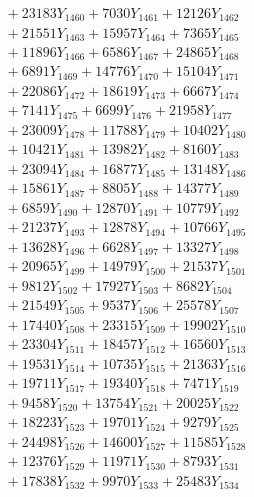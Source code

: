 \documentclass[a4paper,10pt]{article}
\begin{document}
{\begin{align}
&\;  + 23183 Y_{1460} + 7030 Y_{1461} + 12126 Y_{1462} \\[0.3ex]
&\;  + 21551 Y_{1463} + 15957 Y_{1464} + 7365 Y_{1465} \\[0.3ex]
&\;  + 11896 Y_{1466} + 6586 Y_{1467} + 24865 Y_{1468} \\[0.5ex]\allowbreak
&\;  + 6891 Y_{1469} + 14776 Y_{1470} + 15104 Y_{1471} \\[0.3ex]
&\;  + 22086 Y_{1472} + 18619 Y_{1473} + 6667 Y_{1474} \\[0.3ex]
&\;  + 7141 Y_{1475} + 6699 Y_{1476} + 21958 Y_{1477} \\[0.3ex]
&\;  + 23009 Y_{1478} + 11788 Y_{1479} + 10402 Y_{1480} \\[0.3ex]
&\;  + 10421 Y_{1481} + 13982 Y_{1482} + 8160 Y_{1483} \\[0.3ex]
&\;  + 23094 Y_{1484} + 16877 Y_{1485} + 13148 Y_{1486} \\[0.3ex]
&\;  + 15861 Y_{1487} + 8805 Y_{1488} + 14377 Y_{1489} \\[0.3ex]
&\;  + 6859 Y_{1490} + 12870 Y_{1491} + 10779 Y_{1492} \\[0.3ex]
&\;  + 21237 Y_{1493} + 12878 Y_{1494} + 10766 Y_{1495} \\[0.3ex]
&\;  + 13628 Y_{1496} + 6628 Y_{1497} + 13327 Y_{1498} \\[0.5ex]\allowbreak
&\;  + 20965 Y_{1499} + 14979 Y_{1500} + 21537 Y_{1501} \\[0.3ex]
&\;  + 9812 Y_{1502} + 17927 Y_{1503} + 8682 Y_{1504} \\[0.3ex]
&\;  + 21549 Y_{1505} + 9537 Y_{1506} + 25578 Y_{1507} \\[0.3ex]
&\;  + 17440 Y_{1508} + 23315 Y_{1509} + 19902 Y_{1510} \\[0.3ex]
&\;  + 23304 Y_{1511} + 18457 Y_{1512} + 16560 Y_{1513} \\[0.3ex]
&\;  + 19531 Y_{1514} + 10735 Y_{1515} + 21363 Y_{1516} \\[0.3ex]
&\;  + 19711 Y_{1517} + 19340 Y_{1518} + 7471 Y_{1519} \\[0.3ex]
&\;  + 9458 Y_{1520} + 13754 Y_{1521} + 20025 Y_{1522} \\[0.3ex]
&\;  + 18223 Y_{1523} + 19701 Y_{1524} + 9279 Y_{1525} \\[0.3ex]
&\;  + 24498 Y_{1526} + 14600 Y_{1527} + 11585 Y_{1528} \\[0.5ex]\allowbreak
&\;  + 12376 Y_{1529} + 11971 Y_{1530} + 8793 Y_{1531} \\[0.3ex]
&\;  + 17838 Y_{1532} + 9970 Y_{1533} + 25483 Y_{1534} \\[0.3ex]

\end{align}}
\end{document}
